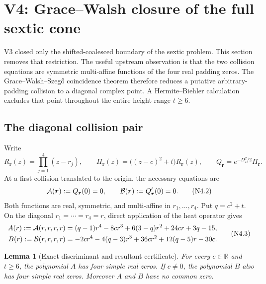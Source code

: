 \documentclass[11pt]{article}
\newtheorem{lemma}[theorem]{Lemma}
\theoremstyle{definition}
\theoremstyle{remark}
\begin{document}
\section{V4: Grace--Walsh closure of the full sextic cone}
\label{sec:grh-v4}

V3 closed only the shifted-coalesced boundary of the sextic problem.  This
section removes that restriction.  The useful upstream observation is that
the two collision equations are symmetric multi-affine functions of the
four real padding zeros.  The Grace--Walsh--Szeg\H{o} coincidence theorem
therefore reduces a putative arbitrary-padding collision to a diagonal
complex point.  A Hermite--Biehler calculation excludes that point throughout
the entire height range \(t\ge 6\).

\subsection{The diagonal collision pair}

Write
\[
 R_{\boldsymbol r}(z)=\prod_{j=1}^{4}(z-r_j),\qquad
 \Pi_{\boldsymbol r}(z)=\bigl((z-c)^2+t\bigr)R_{\boldsymbol r}(z),
 \qquad
 Q_{\boldsymbol r}=e^{-D_z^2/2}\Pi_{\boldsymbol r}.
 \tag{N4.1}
\]
At a first collision translated to the origin, the necessary equations are
\[
 {\cal A}(\boldsymbol r):=Q_{\boldsymbol r}(0)=0,\qquad
 {\cal B}(\boldsymbol r):=Q_{\boldsymbol r}'(0)=0.
 \tag{N4.2}
\]
Both functions are real, symmetric, and multi-affine in
\(r_1,\ldots,r_4\).  Put \(q=c^2+t\).  On the diagonal
\(r_1=\cdots=r_4=r\), direct application of the heat operator gives
\[
\begin{aligned}
 A(r):={\cal A}(r,r,r,r)
 &=(q-1)r^4-8cr^3+6(3-q)r^2+24cr+3q-15,\\
 B(r):={\cal B}(r,r,r,r)
 &=-2cr^4-4(q-3)r^3+36cr^2+12(q-5)r-30c.
\end{aligned}
\tag{N4.3}
\]

\begin{lemma}[Exact discriminant and resultant certificate]
\label{lem:f2v4-factors}
For every \(c\in\mathbb R\) and \(t\ge6\), the polynomial \(A\) has four
simple real zeros.  If \(c\ne0\), the polynomial \(B\) also has four simple
real zeros.  Moreover \(A\) and \(B\) have no common zero.
\end{lemma}
\end{document}
